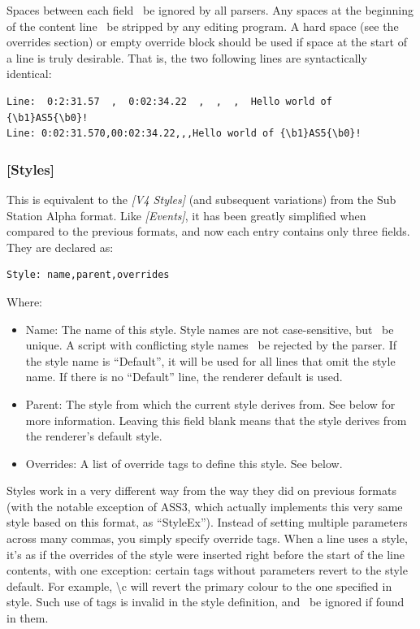 \documentclass{spec}
\begin{document}
Spaces between each field \must\ be ignored by all parsers. Any spaces at the beginning of the
content line \should\ be stripped by any editing program. A hard space (see the overrides section) or empty
override block should be used if space at the start of a line is truly desirable. That is, the two
following lines are syntactically identical:

\begin{verbatim}
Line:  0:2:31.57  ,  0:02:34.22  ,  ,  ,  Hello world of {\b1}AS5{\b0}!
Line: 0:02:31.570,00:02:34.22,,,Hello world of {\b1}AS5{\b0}!
\end{verbatim}


\subsubsection{[Styles]}

This is equivalent to the \emph{[V4 Styles]} (and subsequent variations) from the Sub Station Alpha format.
Like \emph{[Events]}, it has been greatly simplified when compared to the previous formats, and now
each entry contains only three fields. They are declared as:

\begin{verbatim}
Style: name,parent,overrides
\end{verbatim}

Where:

\begin{itemize}
\item Name: The name of this style. Style names are not case-sensitive, but \must\ be unique. A
script with conflicting style names \must\ be rejected by the parser. If the style name is ``Default'', it
will be used for all lines that omit the style name. If there is no ``Default'' line, the renderer
default is used.
\item Parent: The style from which the current style derives from. See below for more information.
Leaving this field blank means that the style derives from the renderer's default style.
\item Overrides: A list of override tags to define this style. See below.
\end{itemize}

Styles work in a very different way from the way they did on previous formats (with the notable exception
of ASS3, which actually implements this very same style based on this format, as ``StyleEx'').
Instead of setting multiple parameters across many commas, you simply specify override tags. When a line
uses a style, it's as if the overrides of the style were inserted right before the start of the line
contents, with one exception: certain tags without parameters revert to the style default. For example,
\textbackslash c will revert the primary colour to the one specified in style. Such use of tags is invalid
in the style definition, and \must\ be ignored if found in them.
\end{document}
